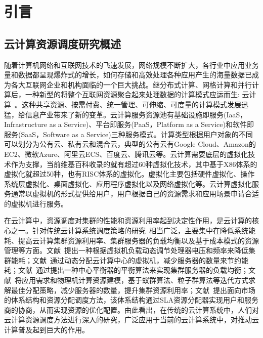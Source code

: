 \chapter{引言}
\section{云计算资源调度研究概述}
随着计算机网络和互联网技术的飞速发展，网络规模不断扩大，各行业中应用业务量和数据都呈现爆炸式的增长，如何存储和高效处理各种应用产生的海量数据已成为各大互联网企业和机构面临的一个巨大挑战。继分布式计算、网格计算和并行计算后，一种新型的将整个互联网资源聚合起来处理数据的计算模式应运而生: 云计算~\cite{Hayes2008Cloud}。这种共享资源、按需付费、统一管理、可伸缩、可度量的计算模式发展迅猛，给信息产业带来了新的变革。云计算服务资源池有基础设施即服务(IaaS，Infrastructure as a Service)、平台即服务(PaaS，Platform as a Service)和软件即服务(SaaS，Software as a Service)三种服务模式。计算类型根据用户对象的不同可以划分为公有云、私有云和混合云，典型的公有云有Google Cloud、Amazon的EC2、微软Azure、阿里云ECS、百度云、腾讯云等。云计算需要底层的虚拟化技术作为支撑，当前维基百科收录的就有超过60种虚拟化技术，其中基于X86体系的虚拟化就超过50种，也有RISC体系的虚拟化。虚拟化主要包括硬件虚拟化、操作系统层虚拟化、桌面虚拟化、应用程序虚拟化以及网络虚拟化等。云计算虚拟化服务通常以虚拟机的形式提供给用户，用户根据自己的资源需求和应用场景申请合适的虚拟机进行服务。

在云计算中，资源调度对集群的性能和资源利用率起到决定性作用，是云计算的核心之一。针对传统云计算系统调度策略的研究~\cite{CloudSummarize}相当广泛，主要集中在降低系统能耗、提高云计算集群资源利用率、集群服务器的负载均衡以及基于成本模式的资源管理等方面。文献~提出一种根据虚拟机负载动态调节处理器电压和频率来降低集群能耗；文献~通过动态分配云计算中心的虚拟机，减少服务器的数量来节约能耗；文献~通过提出一种中心平衡器的平衡算法来实现集群服务器的负载均衡；文献~将应用需求和物理机计算资源建模，基于蚁群算法、粒子群算法等迭代方式求解最佳分配策略，减少服务器的数量，提升集群资源利用率；文献~提出面向市场的体系结构和资源分配调度方法，该体系结构通过SLA资源分配器实现用户和服务商的协商，从而实现资源的优化配置。由此看出，在传统的云计算系统中，人们对云计算资源调度方法进行深入的研究，广泛应用于当前的云计算系统中，对推动云计算普及起到巨大的作用。

